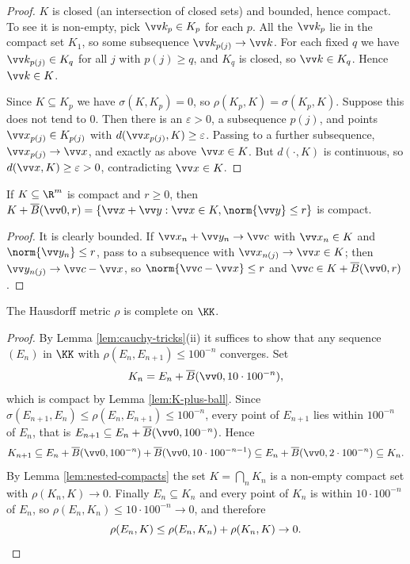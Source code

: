 \begin{proof}
	$K$ is closed (an intersection of closed sets) and bounded, hence compact. To see it is non-empty, pick $\vv k_p\in K_p$ for each $p$. All the $\vv k_p$ lie in the compact set $K_1$, so some subsequence $\vv k_{p(j)}\to\vv k$. For each fixed $q$ we have $\vv k_{p(j)}\in K_q$ for all $j$ with $p(j)\geq q$, and $K_q$ is closed, so $\vv k\in K_q$. Hence $\vv k\in K$.

	Since $K\subseteq K_p$ we have $\sigma(K,K_p)=0$, so $\rho(K_p,K) = \sigma(K_p,K)$. Suppose this does not tend to $0$. Then there is an $\varepsilon>0$, a subsequence $p(j)$, and points $\vv x_{p(j)}\in K_{p(j)}$ with $d(\vv x_{p(j)},K)\geq\varepsilon$. Passing to a further subsequence, $\vv x_{p(j)}\to\vv x$, and exactly as above $\vv x\in K$. But $d(\cdot,K)$ is continuous, so $d(\vv x,K)\geq\varepsilon>0$, contradicting $\vv x\in K$.
\end{proof}

\begin{lemma}\label{lem:K-plus-ball}
	If $K \subseteq\R^m$ is compact and $r \geq 0$, then $K+\overline{B}(\vv 0,r) = \{\vv x+\vv y : \vv x\in K, \norm{\vv y}\leq r\}$ is compact.
\end{lemma}

\begin{proof}
	It is clearly bounded. If $\vv x_n + \vv y_n\to\vv c$ with $\vv x_n\in K$ and $\norm{\vv y_n}\leq r$, pass to a subsequence with $\vv x_{n(j)}\to\vv x\in K$; then $\vv y_{n(j)}\to\vv c-\vv x$, so $\norm{\vv c-\vv x}\leq r$ and $\vv c\in K+\overline{B}(\vv0,r)$.
\end{proof}

\begin{theorem}\label{thm:hausdorff-complete}
	The Hausdorff metric $\rho$ is complete on $\KK$.
\end{theorem}

\begin{proof}
	By Lemma \ref{lem:cauchy-tricks}(ii) it suffices to show that any sequence $(E_n)$ in $\KK$ with $\rho(E_n,E_{n+1})\leq 100^{-n}$ converges. Set
	$$K_n = E_n + \overline{B}(\vv0, 10\cdot 100^{-n}),$$
	which is compact by Lemma \ref{lem:K-plus-ball}. Since $\sigma(E_{n+1},E_n)\leq\rho(E_n,E_{n+1})\leq100^{-n}$, every point of $E_{n+1}$ lies within $100^{-n}$ of $E_n$, that is $E_{n+1}\subseteq E_n + \overline B(\vv0,100^{-n})$. Hence
	$$K_{n+1} \subseteq E_n + \overline B(\vv 0, 100^{-n}) + \overline B(\vv0, 10\cdot 100^{-n-1}) \subseteq E_n + \overline B(\vv0, 2\cdot 100^{-n}) \subseteq K_n.$$
	By Lemma \ref{lem:nested-compacts} the set $K = \bigcap_n K_n$ is a non-empty compact set with $\rho(K_n,K)\to0$. Finally $E_n\subseteq K_n$ and every point of $K_n$ is within $10\cdot100^{-n}$ of $E_n$, so $\rho(E_n,K_n)\leq10\cdot100^{-n}\to0$, and therefore
	$$\rho(E_n,K)\leq\rho(E_n,K_n)+\rho(K_n,K)\to0. \qedhere$$
\end{proof}

